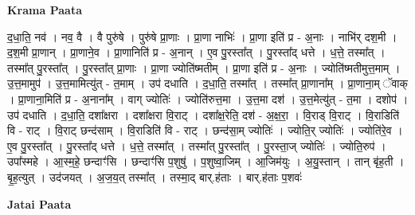 \documentclass[17pt]{extarticle}
\begin{document}
\textbf{Krama Paata} \newline

द॒धा॒ति॒ नव॑ । नव॒ वै । वै पुरु॑षे । पुरु॑षे प्रा॒णाः । प्रा॒णा नाभिः॑ । प्रा॒णा इति॑ प्र - अ॒नाः । नाभि॑र् दश॒मी । द॒श॒मी प्रा॒णान् । प्रा॒णाने॒व । प्रा॒णानिति॑ प्र - अ॒नान् । ए॒व पु॒रस्ता᳚त् । पु॒रस्ता᳚द् धत्ते । ध॒त्ते॒ तस्मा᳚त् । तस्मा᳚त् पु॒रस्ता᳚त् । पु॒रस्ता᳚त् प्रा॒णाः । प्रा॒णा ज्योति॑ष्मतीम् । प्रा॒णा इति॑ प्र - अ॒नाः । ज्योति॑ष्मतीमुत्त॒माम् । उ॒त्त॒मामुप॑ । उ॒त्त॒मामित्यु॑त् - त॒माम् । उप॑ दधाति । द॒धा॒ति॒ तस्मा᳚त् । तस्मा᳚त् प्रा॒णाना᳚म् । प्रा॒णाना॒म् ॅवाक् । प्रा॒णाना॒मिति॑ प्र - अ॒नाना᳚म् । वाग् ज्योतिः॑ । ज्योति॑रुत्त॒मा । उ॒त्त॒मा दश॑ । उ॒त्त॒मेत्यु॑त् - त॒मा । दशोप॑ । उप॑ दधाति । द॒धा॒ति॒ दशा᳚क्षरा । दशा᳚क्षरा वि॒राट् । दशा᳚क्ष॒रेति॒ दश॑ - अ॒क्ष॒रा॒ । वि॒राड् वि॒राट् । वि॒राडिति॑ वि - राट् । वि॒राट् छन्द॑साम् । वि॒राडिति॑ वि - राट् । छन्द॑सा॒म् ज्योतिः॑ । ज्योति॒र् ज्योतिः॑ । ज्योति॑रे॒व । ए॒व पु॒रस्ता᳚त् । पु॒रस्ता᳚द् धत्ते । ध॒त्ते॒ तस्मा᳚त् । तस्मा᳚त् पु॒रस्ता᳚त् । पु॒रस्ता॒ज् ज्योतिः॑ । ज्योति॒रुप॑ । उपा᳚स्महे । आ॒स्म॒हे॒ छन्दाꣳ॑सि । छन्दाꣳ॑सि प॒शुषु॑ । प॒शुष्वा॒जिम् । आ॒जिम॑युः । अ॒यु॒स्तान् । तान् बृ॑ह॒ती । बृ॒ह॒त्युत् । उद॑जयत् । अ॒ज॒य॒त् तस्मा᳚त् । तस्मा॒द् बार्.ह॑ताः । बार्.ह॑ताः प॒शवः॑ \newline

\textbf{Jatai Paata} \newline
\end{document}
